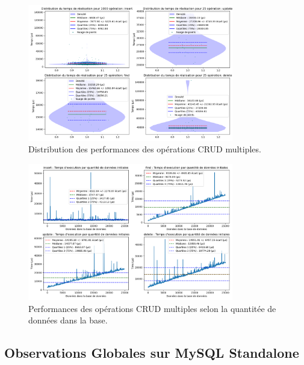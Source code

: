 \documentclass[12pt,a4paper]{report}
\begin{document}
                \begin{figure}[H]
                    \centering
                    \includegraphics[width=0.8\textwidth]{../plots/MySQL/standalone_indexed/global_test_many.png}
                    \caption{Distribution des performances des opérations CRUD multiples.}
                    \label{fig:mysql_standalone_global_many_indexed}
                \end{figure}

                \begin{figure}[H]
                    \centering
                    \includegraphics[width=0.8\textwidth]{../plots/MySQL/standalone_indexed/test_many_various_data.png}
                    \caption{Performances des opérations CRUD multiples selon la quantitée de données dans la base.}
                    \label{fig:mysql_standalone_global_many_various_indexed}
                \end{figure}

        \subsection{Observations Globales sur MySQL Standalone}
\end{document}
